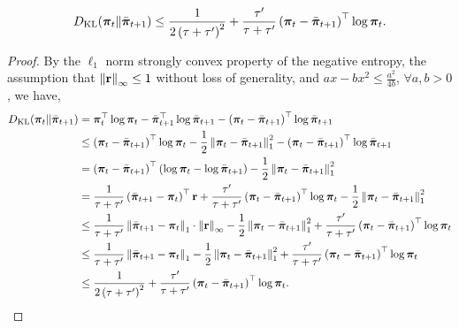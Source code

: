 \begin{lem}
\label{lem:kl_t_bar_tp1_bound}
\begin{equation*}
\begin{split}
    D_{\mathrm{KL}}{\left( {\boldsymbol{\pi}}_t \middle\| \bar{{\boldsymbol{\pi}}}_{t+1} \right)} \le \frac{1}{2\left(\tau + \tau^\prime\right)^2} + \frac{\tau^\prime}{\tau + \tau^\prime} \left( {\boldsymbol{\pi}}_t - \bar{{\boldsymbol{\pi}}}_{t+1} \right)^\top \log{{\boldsymbol{\pi}}_t}.
\end{split}
\end{equation*}
\end{lem}
\begin{proof}
By the $\ell_1$ norm strongly convex property of the negative entropy, the assumption that $\left\| {\mathbf{r}} \right\|_\infty \le 1$ without loss of generality, and $a x - b x^2 \le \frac{a^2}{4 b}$, $\forall a, b > 0$, we have,
\begin{equation*}
\begin{split}
    D_{\mathrm{KL}}{\left( {\boldsymbol{\pi}}_t \middle\| \bar{{\boldsymbol{\pi}}}_{t+1} \right)} &= {\boldsymbol{\pi}}_t^\top \log{{\boldsymbol{\pi}}_t} - \bar{{\boldsymbol{\pi}}}_{t+1}^\top \log{\bar{{\boldsymbol{\pi}}}_{t+1}} - \left( {\boldsymbol{\pi}}_t - \bar{{\boldsymbol{\pi}}}_{t+1} \right)^\top \log{\bar{{\boldsymbol{\pi}}}_{t+1}} \\
    &\le \left( {\boldsymbol{\pi}}_t - \bar{{\boldsymbol{\pi}}}_{t+1} \right)^\top \log{{\boldsymbol{\pi}}_t} - \frac{1}{2} \left\| {\boldsymbol{\pi}}_t - \bar{{\boldsymbol{\pi}}}_{t+1} \right\|_1^2 - \left( {\boldsymbol{\pi}}_t - \bar{{\boldsymbol{\pi}}}_{t+1} \right)^\top \log{\bar{{\boldsymbol{\pi}}}_{t+1}} \\
    &= \left( {\boldsymbol{\pi}}_t - \bar{{\boldsymbol{\pi}}}_{t+1} \right)^\top \left( \log{{\boldsymbol{\pi}}_t} - \log{\bar{{\boldsymbol{\pi}}}_{t+1}} \right) - \frac{1}{2} \left\| {\boldsymbol{\pi}}_t - \bar{{\boldsymbol{\pi}}}_{t+1} \right\|_1^2 \\
    &= \frac{1}{\tau + \tau^\prime} \left( \bar{{\boldsymbol{\pi}}}_{t+1} - {\boldsymbol{\pi}}_t \right)^\top {\mathbf{r}} + \frac{\tau^\prime}{\tau + \tau^\prime} \left( {\boldsymbol{\pi}}_t - \bar{{\boldsymbol{\pi}}}_{t+1} \right)^\top \log{{\boldsymbol{\pi}}_t} - \frac{1}{2} \left\| {\boldsymbol{\pi}}_t - \bar{{\boldsymbol{\pi}}}_{t+1} \right\|_1^2 \\
    &\le \frac{1}{\tau + \tau^\prime} \left\| \bar{{\boldsymbol{\pi}}}_{t+1} - {\boldsymbol{\pi}}_t \right\|_1 \cdot \left\| {\mathbf{r}} \right\|_\infty - \frac{1}{2} \left\| {\boldsymbol{\pi}}_t - \bar{{\boldsymbol{\pi}}}_{t+1} \right\|_1^2 + \frac{\tau^\prime}{\tau + \tau^\prime} \left( {\boldsymbol{\pi}}_t - \bar{{\boldsymbol{\pi}}}_{t+1} \right)^\top \log{{\boldsymbol{\pi}}_t} \\
    &\le \frac{1}{\tau + \tau^\prime} \left\| \bar{{\boldsymbol{\pi}}}_{t+1} - {\boldsymbol{\pi}}_t \right\|_1  - \frac{1}{2} \left\| {\boldsymbol{\pi}}_t - \bar{{\boldsymbol{\pi}}}_{t+1} \right\|_1^2 + \frac{\tau^\prime}{\tau + \tau^\prime} \left( {\boldsymbol{\pi}}_t - \bar{{\boldsymbol{\pi}}}_{t+1} \right)^\top \log{{\boldsymbol{\pi}}_t} \\
    &\le \frac{1}{2\left(\tau + \tau^\prime\right)^2} + \frac{\tau^\prime}{\tau + \tau^\prime} \left( {\boldsymbol{\pi}}_t - \bar{{\boldsymbol{\pi}}}_{t+1} \right)^\top \log{{\boldsymbol{\pi}}_t}. \qedhere
\end{split}
\end{equation*}
\end{proof}


